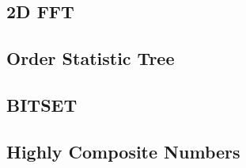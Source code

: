\documentclass[10pt,landscape,a4paper,twocolumn]{article}
\begin{document}
\subsection{2D FFT}


\subsection{Order Statistic Tree}


\subsection{BITSET}


\subsection{Highly Composite Numbers}

\end{document}

